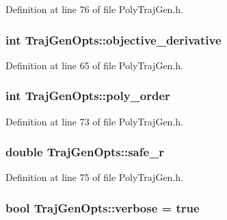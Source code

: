 Definition at line 76 of file Poly\+Traj\+Gen.\+h.

\subsubsection[{\texorpdfstring{objective\+\_\+derivative}{objective_derivative}}]{\setlength{\rightskip}{0pt plus 5cm}int Traj\+Gen\+Opts\+::objective\+\_\+derivative}\hypertarget{struct_traj_gen_opts_ad8937f645e1154dc52978bd6592ce836}{}\label{struct_traj_gen_opts_ad8937f645e1154dc52978bd6592ce836}


Definition at line 65 of file Poly\+Traj\+Gen.\+h.

\subsubsection[{\texorpdfstring{poly\+\_\+order}{poly_order}}]{\setlength{\rightskip}{0pt plus 5cm}int Traj\+Gen\+Opts\+::poly\+\_\+order}\hypertarget{struct_traj_gen_opts_a538985230ef4a8cd7763c91d11bebbaf}{}\label{struct_traj_gen_opts_a538985230ef4a8cd7763c91d11bebbaf}


Definition at line 73 of file Poly\+Traj\+Gen.\+h.

\subsubsection[{\texorpdfstring{safe\+\_\+r}{safe_r}}]{\setlength{\rightskip}{0pt plus 5cm}double Traj\+Gen\+Opts\+::safe\+\_\+r}\hypertarget{struct_traj_gen_opts_aba857cb0ae86cbac99ba5adf9320c66d}{}\label{struct_traj_gen_opts_aba857cb0ae86cbac99ba5adf9320c66d}


Definition at line 75 of file Poly\+Traj\+Gen.\+h.

\subsubsection[{\texorpdfstring{verbose}{verbose}}]{\setlength{\rightskip}{0pt plus 5cm}bool Traj\+Gen\+Opts\+::verbose = true}\hypertarget{struct_traj_gen_opts_ab4888a8e142d514867bb3dfacb84e3d2}{}\label{struct_traj_gen_opts_ab4888a8e142d514867bb3dfacb84e3d2}


